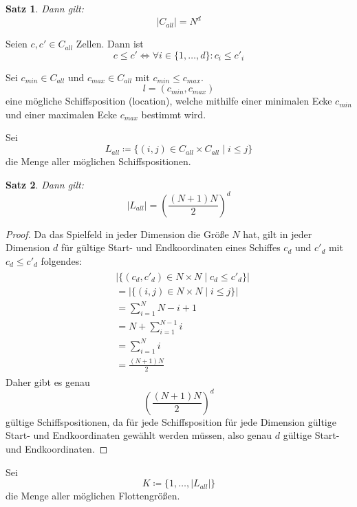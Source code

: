 \documentclass[a4paper,12pt]{llncs}
\numberwithin{equation}{section}
\newtheorem{satz}{Satz}
\begin{document}
\begin{satz}
Dann gilt:
\[
|C_{all}|=N^d
\]
\end{satz}

\begin{definition}
Seien $c, c' \in C_{all}$ Zellen.
Dann ist
\[
c \leq c' \Leftrightarrow \forall i \in \{1, \dots, d\} \colon c_{i} \leq c'_{i} 
\]
\end{definition}

\begin{definition}
Sei $c_{min} \in C_{all}$ und $c_{max} \in C_{all}$ mit $c_{min} \leq c_{max}$.
\[
l=(c_{min}, c_{max})
\]
eine mögliche Schiffsposition (location), welche mithilfe einer minimalen Ecke $c_{min}$ und einer maximalen Ecke $c_{max}$ bestimmt wird.
\end{definition}

\begin{definition}
Sei 
\[
L_{all} \coloneqq
\{
(i, j) \in C_{all} \times C_{all}
\mid
i \leq j
\}
\] die Menge aller möglichen Schiffspositionen.
\end{definition}

\begin{satz}
Dann gilt:
\[
|L_{all}|=\left(\frac{(N+1) N}{2}\right)^d
\]
\end{satz}

\begin{proof}
Da das Spielfeld in jeder Dimension die Größe $N$ hat, gilt in jeder Dimension $d$ für gültige Start- und Endkoordinaten eines Schiffes $c_d$ und $c'_d$ mit $c_d \leq c'_d$ folgendes:
\begin{align}
\begin{split}
&|\{(c_d, c'_d) \in N \times N \mid c_d \leq c'_d\}|\\
&=|\{(i, j) \in N \times N \mid i \leq j\}|\\
&=\sum_{i=1}^N N - i + 1\\
&=N + \sum_{i=1}^{N-1} i\\
&=\sum_{i=1}^{N} i\\
&= \frac{(N + 1) N}{2}
\nonumber
\end{split}
\end{align}
Daher gibt es genau
\[
\left(\frac{(N+1) N}{2}\right)^d
\]
gültige Schiffspositionen, da für jede Schiffsposition für jede Dimension gültige Start- und Endkoordinaten gewählt werden müssen, also genau $d$ gültige Start- und Endkoordinaten.
\end{proof}

\begin{definition}
Sei 
\[
K \coloneqq \{1, \dots, |L_{all}|\}
\]
die Menge aller möglichen Flottengrößen.
\end{definition}
\end{document}
